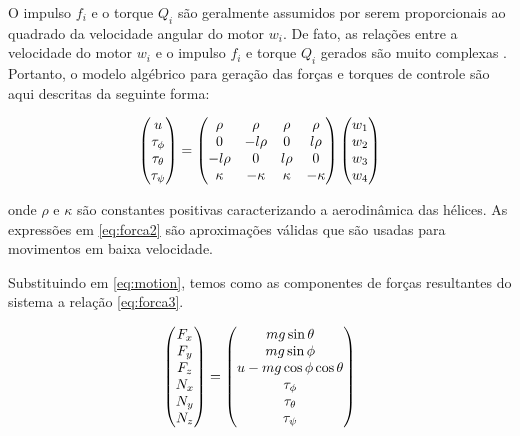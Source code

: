 \documentclass[a4paper, 12pt]{article}
\begin{document}
O impulso $f_i$ e o torque $Q_i$ são geralmente assumidos por serem proporcionais ao quadrado da velocidade angular do motor $w_i$. De fato, as relações entre a velocidade do motor $w_i$ e o impulso $f_i$ e torque $Q_i$ gerados são  muito complexas \cite{McCormick1995}\cite{Prouty1995}. Portanto, o modelo algébrico para geração das forças e torques de controle são aqui descritas da seguinte forma: 

\begin{equation}
\centering
\begin{pmatrix} 
	u \\ \tau _{ \phi  } \\ \tau _{ \theta  } \\ \tau _{ \psi  } 
\end{pmatrix}=
\begin{pmatrix}
	\rho  & \rho  & \rho  & \rho  \\ 
	0 & -l\rho  & 0 & l\rho  \\ 
	-l\rho  & 0 & l\rho  & 0 \\ 
	\kappa  & -\kappa  & \kappa  & -\kappa 
\end{pmatrix}
\begin{pmatrix}
	{ w }_{ 1 } \\ { w }_{ 2 } \\{ w }_{ 3 }\\ { w }_{ 4 }
\end{pmatrix}
\label{eq:forca2}
\end{equation}

\noindent onde $\rho$ e $\kappa$ são constantes positivas caracterizando a aerodinâmica das hélices. As expressões em \ref{eq:forca2} são aproximações válidas que são usadas para movimentos em baixa velocidade. 

Substituindo em \ref{eq:motion}, temos como as componentes de forças resultantes do sistema a relação \ref{eq:forca3}. 

\begin{equation}
\centering
\begin{pmatrix}
	F_x \\ F_y \\ F_z \\ N_x \\ N_y \\ N_z 
\end{pmatrix} = 
\begin{pmatrix}
mg\sin{\theta} \\ mg\sin{\phi} \\ u - mg\cos{\phi}\cos{\theta} \\ \tau_{\phi} \\ \tau_{\theta} \\ \tau_{\psi} 
\end{pmatrix}
\label{eq:forca3}
\end{equation}
\end{document}
